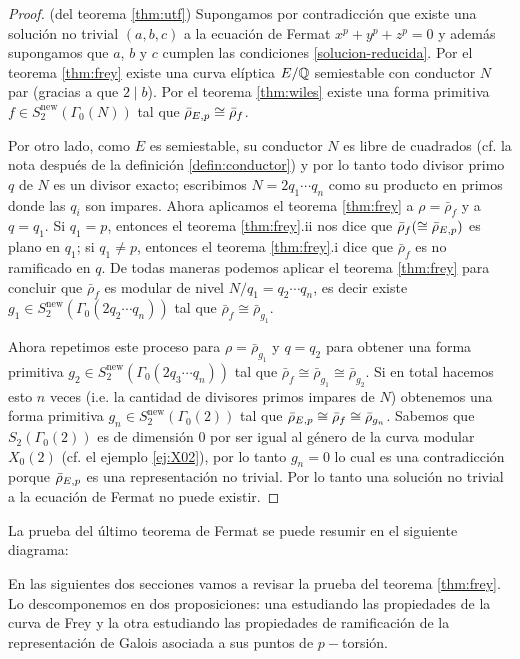 \begin{proof}(del teorema \ref{thm:utf})
	Supongamos por contradicción que existe una solución no trivial $(a,b,c)$ a la ecuación de Fermat $x^p+y^p+z^p=0$ y además supongamos que $a$, $b$ y $c$ cumplen las condiciones \ref{solucion-reducida}. Por el teorema \ref{thm:frey} existe una curva elíptica $E/\mathbb{Q}$ semiestable con conductor $N$ par (gracias a que $2\mid b$). Por el teorema \ref{thm:wiles} existe una forma primitiva $f\in S_2^{\mathrm{new}}(\Gamma_0(N))$ tal que $\bar{\rho}_{E,p}\cong\bar{\rho}_f$.
	
	Por otro lado, como $E$ es semiestable, su conductor $N$ es libre de cuadrados (cf. la nota después de la definición \ref{defin:conductor}) y por lo tanto todo divisor primo $q$ de $N$ es un divisor exacto; escribimos $N=2q_1\cdots q_n$ como su producto en primos donde las $q_i$ son impares. Ahora aplicamos el teorema \ref{thm:frey} a $\rho=\bar{\rho}_f$ y a $q=q_1$. Si $q_1=p$, entonces el teorema \ref{thm:frey}.ii nos dice que $\bar{\rho}_f(\cong\bar{\rho}_{E,p})$ es plano en $q_1$; si $q_1\neq p$, entonces el teorema \ref{thm:frey}.i dice que $\bar{\rho}_f$ es no ramificado en $q$. De todas maneras podemos aplicar el teorema \ref{thm:frey} para concluir que $\bar{\rho}_f$ es modular de nivel $N/q_1=q_2\cdots q_n$, es decir existe $g_1\in S_2^{\mathrm{new}}(\Gamma_0(2q_2\cdots q_n))$ tal que $\bar{\rho}_f\cong\bar{\rho}_{g_1}$.
	
	Ahora repetimos este proceso para $\rho=\bar{\rho}_{g_1}$ y $q=q_2$ para obtener una forma primitiva $g_2\in S_2^{\mathrm{new}}(\Gamma_0(2q_3\cdots q_n))$ tal que $\bar{\rho}_f\cong\bar{\rho}_{g_1}\cong\bar{\rho}_{g_2}$. Si en total hacemos esto $n$ veces (i.e. la cantidad de divisores primos impares de $N$) obtenemos una forma primitiva $g_n\in S_2^{\mathrm{new}}(\Gamma_0(2))$ tal que $\bar{\rho}_{E,p}\cong\bar{\rho}_f\cong\bar{\rho}_{g_n}$. Sabemos que $S_2(\Gamma_0(2))$ es de dimensión 0 por ser igual al género de la curva modular $X_0(2)$ (cf. el ejemplo \ref{ej:X02}), por lo tanto $g_n=0$ lo cual es una contradicción porque $\bar{\rho}_{E,p}$ es una representación no trivial. Por lo tanto una solución no trivial a la ecuación de Fermat no puede existir.
\end{proof}

La prueba del último teorema de Fermat se puede resumir en el siguiente diagrama:
\newline

\begingroup
\centering

\endgroup

En las siguientes dos secciones vamos a revisar la prueba del teorema \ref{thm:frey}. Lo descomponemos en dos proposiciones: una estudiando las propiedades de la curva de Frey y la otra estudiando las propiedades de ramificación de la representación de Galois asociada a sus puntos de $p-$torsión.